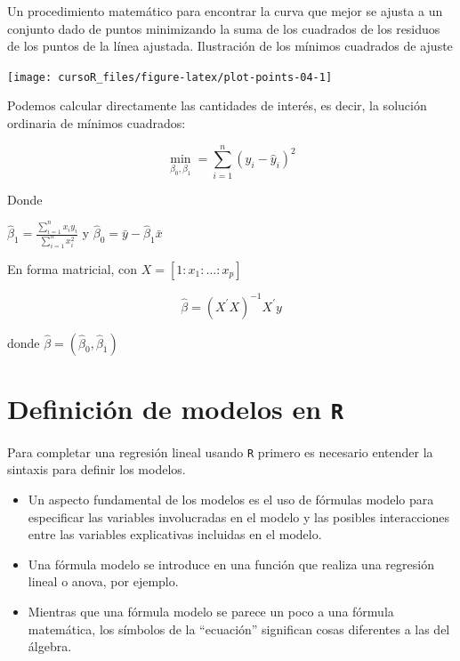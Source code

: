 \documentclass[]{book}
\begin{document}
Un procedimiento matemático para encontrar la curva que mejor se ajusta
a un conjunto dado de puntos minimizando la suma de los cuadrados de los
residuos de los puntos de la línea ajustada. Ilustración de los mínimos
cuadrados de ajuste

\begin{center}\texttt{[image: cursoR\_files/figure-latex/plot-points-04-1]} \end{center}

Podemos calcular directamente las cantidades de interés, es decir, la
solución ordinaria de mínimos cuadrados:

\[
\min_{\beta_0,\beta_1} = \sum_{i=1}^{n} (y_i - \hat{y}_i)^2  
\]

Donde

\(\hat{\beta}_1 = \frac{\sum_{i=1}^{n}x_iy_i}{\sum_{i=1}^n x_i^2}\) y
\(\hat{\beta}_0 = \bar{y} - \hat{\beta}_1\bar{x}\)

En forma matricial, con \(X=[1:x_1:...:x_p]\)

\[
\hat{\beta}  = (X^\prime X)^{-1} X^\prime y
\]

donde \(\hat{\beta} = (\hat{\beta}_0,\hat{\beta}_1)\)

\section{\texorpdfstring{Definición de modelos en
\texttt{R}}{Definición de modelos en R}}\label{definiciuxf3n-de-modelos-en-r}

Para completar una regresión lineal usando \texttt{R} primero es
necesario entender la sintaxis para definir los modelos.

\begin{itemize}
\item
  Un aspecto fundamental de los modelos es el uso de fórmulas modelo
  para especificar las variables involucradas en el modelo y las
  posibles interacciones entre las variables explicativas incluidas en
  el modelo.
\item
  Una fórmula modelo se introduce en una función que realiza una
  regresión lineal o anova, por ejemplo.
\item
  Mientras que una fórmula modelo se parece un poco a una fórmula
  matemática, los símbolos de la ``ecuación'' significan cosas
  diferentes a las del álgebra.
\end{itemize}
\end{document}
